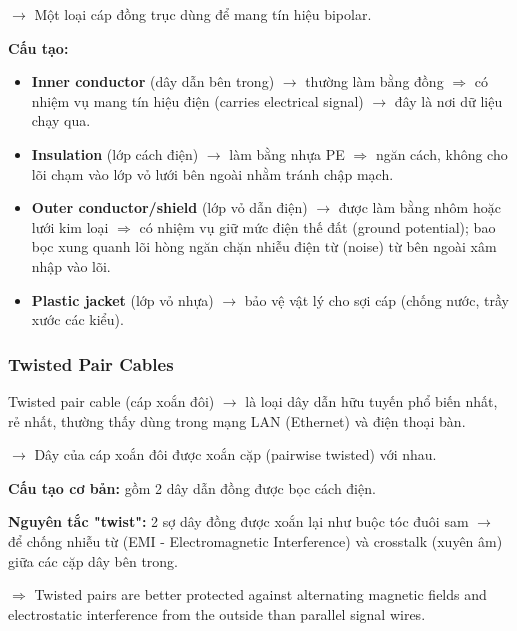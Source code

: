 \noindent
$\rightarrow$ Một loại cáp đồng trục dùng để mang tín hiệu bipolar.
\medskip

\noindent
\textbf{Cấu tạo:}

\begin{itemize}
    \item \textbf{Inner conductor} (dây dẫn bên trong) $\rightarrow$ thường làm bằng đồng $\Rightarrow$ có nhiệm vụ mang tín hiệu điện (carries electrical signal) $\rightarrow$ đây là nơi dữ liệu chạy qua.
    \item \textbf{Insulation} (lớp cách điện) $\rightarrow$ làm bằng nhựa PE $\Rightarrow$ ngăn cách, không cho lõi chạm vào lớp vỏ lưới bên ngoài nhằm tránh chập mạch.
    \item \textbf{Outer conductor/shield} (lớp vỏ dẫn điện) $\rightarrow$ được làm bằng nhôm hoặc lưới kim loại $\Rightarrow$ có nhiệm vụ giữ mức điện thế đất (ground potential); bao bọc xung quanh lõi hòng ngăn chặn nhiễu điện từ (noise) từ bên ngoài xâm nhập vào lõi.
    \item \textbf{Plastic jacket} (lớp vỏ nhựa) $\rightarrow$ bảo vệ vật lý cho sợi cáp (chống nước, trầy xước các kiểu).
\end{itemize}
\medskip


\subsubsection{Twisted Pair Cables}

\noindent
Twisted pair cable (cáp xoắn đôi) $\rightarrow$ là loại dây dẫn hữu tuyến phổ biến nhất, rẻ nhất, thường thấy dùng trong mạng LAN (Ethernet) và điện thoại bàn.
\medskip

\noindent
$\rightarrow$ Dây của cáp xoắn đôi được xoắn cặp (pairwise twisted) với nhau.
\medskip

\noindent
\textbf{Cấu tạo cơ bản:} gồm 2 dây dẫn đồng được bọc cách điện.
\medskip

\noindent
\textbf{Nguyên tắc "twist":} 2 sợ dây đồng được xoắn lại như buộc tóc đuôi sam $\rightarrow$ để chống nhiễu từ (EMI - Electromagnetic Interference) và crosstalk (xuyên âm) giữa các cặp dây bên trong.

$\Rightarrow$ Twisted pairs are better protected against alternating magnetic fields and electrostatic interference from the outside than parallel signal wires.
\medskip

